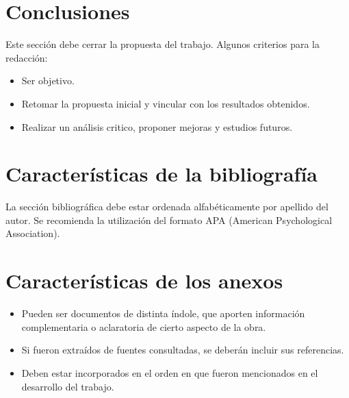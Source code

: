 \documentclass{article}[11pt]
\begin{document}
\section{Conclusiones}
Este sección debe cerrar la propuesta del trabajo. Algunos criterios para la redacción: \\

\begin{itemize}
\item Ser objetivo. 
\item Retomar la propuesta inicial y vincular con los resultados obtenidos.
\item Realizar un análisis critico, proponer mejoras y estudios futuros.
\end{itemize}

\section{Características de la bibliografía}
La sección bibliográfica debe estar ordenada alfabéticamente por apellido del autor. Se recomienda la utilización del formato APA (American Psychological Association).

\section{Características de los anexos}

\begin{itemize}
\item Pueden ser documentos de distinta índole, que aporten información complementaria o aclaratoria de cierto aspecto de la obra. 
\item Si fueron extraídos de fuentes consultadas, se deberán incluir sus referencias. 
\item Deben estar incorporados en el orden en que fueron mencionados en el desarrollo del trabajo.
\end{itemize}


\newpage

\nocite{*}
\end{document}
